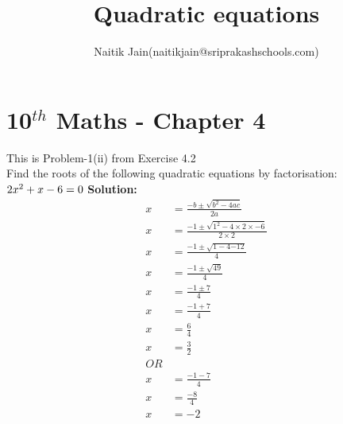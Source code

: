 \documentclass[12pt]{article}
\title{Quadratic equations}
\author{Naitik Jain(naitikjain@sriprakashschools.com)}
\newcommand{\solution}{\noindent \textbf{Solution: }}
\begin{document}
\section*{10$^{th}$ Maths - Chapter 4}
This is Problem-1(ii) from Exercise 4.2\\
Find the roots of the following quadratic equations by factorisation:\\
${{2}x^2+ {x} -{6} }= 0\\$
\solution\\
\begin{align}
x&=\frac{-b\pm\sqrt{b^2-4ac}}{2a}\\
x&=\frac{-1\pm\sqrt{1^2-4 \times 2\times -6}}{2 \times 2}\\
x&=\frac{-1\pm\sqrt{1-{4}{-12}}}{4}\\
x&=\frac{-1\pm\sqrt{49}}{4}\\
x&=\frac{-1\pm{7}}{4}\\
x&=\frac{-1+7}{4}\\
x&=\frac{6}{4}\\
x&=\frac{3}{2}\\
OR\\
x&=\frac{-1-7}{4}\\
x&=\frac{-8}{4}\\
x&=-2
\end{align}
\end{document}
